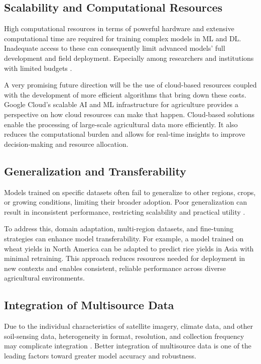 \documentclass[conference]{IEEEtran}
\begin{document}
\subsection{Scalability and Computational Resources}\label{AA}
High computational resources in terms of powerful hardware and extensive computational time are required for training complex models in ML and DL. Inadequate access to these can consequently limit advanced models' full development and field deployment. Especially among researchers and institutions with limited budgets \cite{b86}. 

A very promising future direction will be the use of cloud-based resources coupled with the development of more efficient algorithms that bring down these costs. Google Cloud's scalable AI and ML infrastructure for agriculture provides a perspective on how cloud resources can make that happen. Cloud-based solutions enable the processing of large-scale agricultural data more efficiently. It also reduces the computational burden and allows for real-time insights to improve decision-making and resource allocation.

\subsection{Generalization and Transferability}\label{AA}
Models trained on specific datasets often fail to generalize to other regions, crops, or growing conditions, limiting their broader adoption. Poor generalization can result in inconsistent performance, restricting scalability and practical utility \cite{b87}.

To address this, domain adaptation, multi-region datasets, and fine-tuning strategies can enhance model transferability. For example, a model trained on wheat yields in North America can be adapted to predict rice yields in Asia with minimal retraining. This approach reduces resources needed for deployment in new contexts and enables consistent, reliable performance across diverse agricultural environments.

\subsection{Integration of Multisource Data}\label{AA}
Due to the individual characteristics of satellite imagery, climate data, and other soil-sensing data, heterogeneity in format, resolution, and collection frequency may complicate integration \cite{b88}. Better integration of multisource data is one of the leading factors toward greater model accuracy and robustness. 
\end{document}
